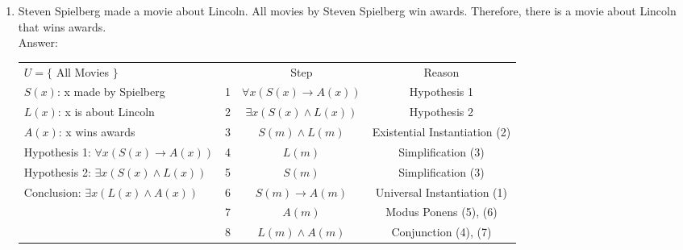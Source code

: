 \begin{enumerate}
\begin{enumerate}
\item Steven Spielberg made a movie about Lincoln.  All movies by Steven Spielberg win awards. 
         Therefore, there is a movie about Lincoln that wins awards.\\
         Answer: 
\begin{table}[h]
\centering
\begin{tabular}{llcc}
$U=\{$ All Movies $\}$                                                   & \multicolumn{1}{c}{}   & Step                                                       & Reason                                              \\ \cline{2-4} 
\multicolumn{1}{l|}{$S(x)$: x made by Spielberg}                         & \multicolumn{1}{c|}{1} & \multicolumn{1}{c|}{$\forall x ( S(x) \rightarrow A(x) )$} & \multicolumn{1}{c|}{Hypothesis 1}                   \\ \cline{2-4} 
\multicolumn{1}{l|}{$L(x)$: x is about Lincoln}                          & \multicolumn{1}{c|}{2} & \multicolumn{1}{c|}{$\exists x (S(x) \wedge L(x))$}        & \multicolumn{1}{c|}{Hypothesis 2}                   \\ \cline{2-4} 
\multicolumn{1}{l|}{$A(x)$: x wins awards}                               & \multicolumn{1}{c|}{3} & \multicolumn{1}{c|}{$S(m) \wedge L(m)$}                    & \multicolumn{1}{c|}{Existential Instantiation (2)}  \\ \cline{2-4} 
\multicolumn{1}{l|}{Hypothesis 1: $\forall x ( S(x) \rightarrow A(x) )$} & \multicolumn{1}{c|}{4} & \multicolumn{1}{c|}{$L(m)$}                                & \multicolumn{1}{c|}{Simplification (3)}             \\ \cline{2-4} 
\multicolumn{1}{l|}{Hypothesis 2: $\exists x (S(x) \wedge L(x))$}        & \multicolumn{1}{l|}{5} & \multicolumn{1}{c|}{$S(m)$}                                & \multicolumn{1}{c|}{Simplification (3)}             \\ \cline{2-4} 
\multicolumn{1}{l|}{Conclusion: $\exists x ( L(x) \wedge A(x) )$}        & \multicolumn{1}{l|}{6} & \multicolumn{1}{c|}{$S(m) \rightarrow A(m)$}               & \multicolumn{1}{c|}{Universal Instantiation (1)}    \\ \cline{2-4} 
\multicolumn{1}{l|}{}                                                    & \multicolumn{1}{l|}{7} & \multicolumn{1}{c|}{$A(m)$}                                & \multicolumn{1}{c|}{Modus Ponens (5), (6)}          \\ \cline{2-4} 
\multicolumn{1}{l|}{}                                                    & \multicolumn{1}{l|}{8} & \multicolumn{1}{c|}{$L(m) \wedge A(m)$}                    & \multicolumn{1}{c|}{Conjunction (4), (7)}           \\ \cline{2-4} 

\end{tabular}
\end{table}
\end{enumerate}
\end{enumerate}
